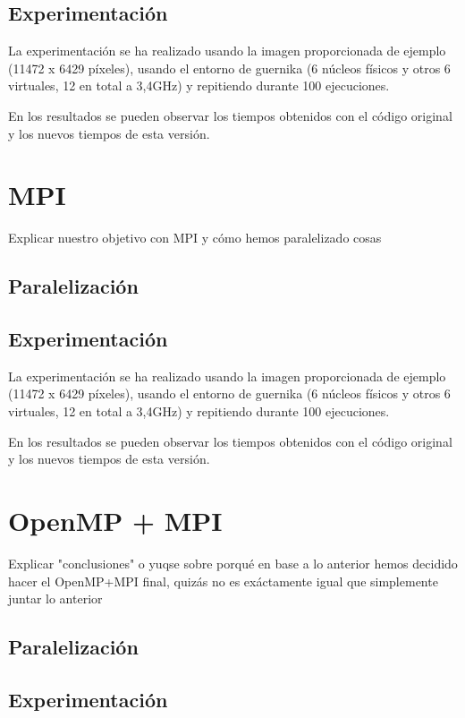 \documentclass[12pt]{report} %
\begin{document}
\section{Experimentación}

La experimentación se ha realizado usando la imagen proporcionada de ejemplo (11472 x 6429 píxeles), usando el entorno de guernika (6 núcleos físicos y otros 6 virtuales, 12 en total a 3,4GHz) y repitiendo durante 100 ejecuciones.

En los resultados se pueden observar los tiempos obtenidos con el código original y los nuevos tiempos de esta versión.

\chapter{MPI}
\label{chap:MPI}

Explicar nuestro objetivo con MPI y cómo hemos paralelizado cosas

\section{Paralelización}

\section{Experimentación}

La experimentación se ha realizado usando la imagen proporcionada de ejemplo (11472 x 6429 píxeles), usando el entorno de guernika (6 núcleos físicos y otros 6 virtuales, 12 en total a 3,4GHz) y repitiendo durante 100 ejecuciones.

En los resultados se pueden observar los tiempos obtenidos con el código original y los nuevos tiempos de esta versión.

\chapter{OpenMP + MPI}
\label{chap:OpenMP+MPI}
Explicar "conclusiones" o yuqse sobre porqué en base a lo anterior hemos decidido hacer el OpenMP+MPI final, quizás no es exáctamente igual que simplemente juntar lo anterior

\section{Paralelización}

\section{Experimentación}
\end{document}
